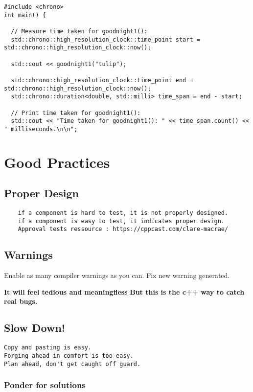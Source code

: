 \begin{verbatim}
#include <chrono>
int main() {

  // Measure time taken for goodnight1():
  std::chrono::high_resolution_clock::time_point start = std::chrono::high_resolution_clock::now();

  std::cout << goodnight1("tulip");

  std::chrono::high_resolution_clock::time_point end = std::chrono::high_resolution_clock::now();
  std::chrono::duration<double, std::milli> time_span = end - start;

  // Print time taken for goodnight1():
  std::cout << "Time taken for goodnight1(): " << time_span.count() << " milliseconds.\n\n";
\end{verbatim}

\chapter{Good Practices}

\section{Proper Design}

\begin{verbatim}
    if a component is hard to test, it is not properly designed. 
    if a component is easy to test, it indicates proper design. 
    Approval tests ressource : https://cppcast.com/clare-macrae/ 
\end{verbatim}

\section{Warnings}

Enable as many compiler warnings as you can. 
Fix new warning generated. 

\textbf{It will feel tedious and meaningfless}
\textbf{But this is the c++ way to catch real bugs.}

\section{Slow Down!}

\begin{verbatim}
Copy and pasting is easy. 
Forging ahead in comfort is too easy.
Plan ahead, don't get caught off guard. 
\end{verbatim}

\subsection{Ponder for solutions}

